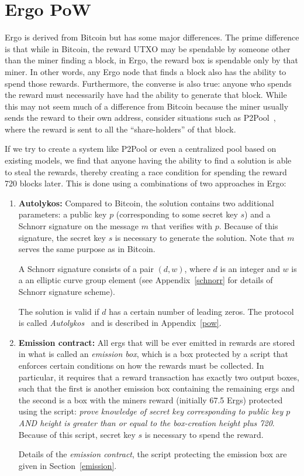 \documentclass[runningheads]{llncs}
\newcommand{\powname}{Autolykos\xspace}
\begin{document}
\section{Ergo PoW}

Ergo is derived from Bitcoin but has some major differences. The prime difference is that while in Bitcoin, the reward UTXO may be spendable by someone other than the miner finding a block, in Ergo, the reward box is spendable only by that miner. In other words, any Ergo node that finds a block also has the ability to spend those rewards. Furthermore, the converse is also true: anyone who spends the reward must necessarily have had the ability to generate that block. While this may not seem much of a difference from Bitcoin because the miner usually sends the reward to their own address, consider situations such as P2Pool~\cite{p2pool}, where the reward is sent to all the ``share-holders'' of that block. 

If we try to create a system like P2Pool or even a centralized pool based on existing models, we find that anyone having the ability to find a solution is able to steal the rewards, thereby creating a race condition for spending the reward 720 blocks later. This is done using a combinations of two approaches in Ergo:
\begin{enumerate}
	\item \textbf{\powname:} Compared to Bitcoin, the solution contains two additional parameters: a public key $p$ (corresponding to some secret key $s$) and a Schnorr signature on the message $m$ that verifies with $p$. Because of this signature, the secret key $s$ is necessary to generate the solution. Note that $m$ serves the same purpose as in Bitcoin.

	A Schnorr signature consists of a pair $(d, w)$, where $d$ is an integer and $w$ is a an elliptic curve group element (see Appendix~\ref{schnorr} for details of Schnorr signature scheme). 

	The solution is valid if $d$ has a certain number of leading zeros. 
	The protocol is called {\em \powname}~\cite{autolykos} and is described in Appendix~\ref{pow}.
	\item \textbf{Emission contract:} All ergs that will be ever emitted in rewards are stored in what is called an {\em emission box}, which is a box protected by a script that enforces certain conditions on how the rewards must be collected. In particular, it requires that a reward transaction has exactly two output boxes, such that the first is another emission box containing the remaining ergs and the second is a box with the miners reward (initially 67.5 Ergs) protected using the script: {\em prove knowledge of secret key corresponding to public key $p$ AND height is greater than or equal to the box-creation height plus 720}. 
	Because of this script, secret key $s$ is necessary to spend the reward. 
	
	Details of the {\em emission contract}, the script protecting the emission box are given in Section~\ref{emission}.
\end{enumerate} 
\end{document}
